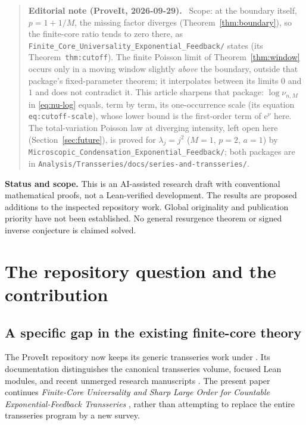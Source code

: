 \documentclass[11pt,a4paper]{article}
\numberwithin{equation}{section}
\theoremstyle{definition}
\theoremstyle{remark}
\newcommand{\ee}{\mathrm e}\newcommand{\dd}{\mathrm d}
\newenvironment{ednote}{\par\smallskip\begin{quote}\small\raggedright\textbf{Editorial note (ProveIt, 2026-09-29).}\ }{\end{quote}\smallskip}
\begin{document}
\begin{ednote}
Scope: at the boundary itself, $p=1+1/M$, the missing factor diverges
(Theorem~\ref{thm:boundary}), so the finite-core ratio tends to zero there,
as \nolinkurl{Finite_Core_Universality_Exponential_Feedback/} states (its
Theorem~\texttt{thm:cutoff}). The finite Poisson limit of
Theorem~\ref{thm:window} occurs only in a moving window slightly
\emph{above} the boundary, outside that package's fixed-parameter theorem;
it interpolates between its limits $0$ and $1$ and does not contradict it.
This article sharpens that package: $\log\nu_{n,M}$ in
\eqref{eq:nu-log} equals, term by term, its one-occurrence scale
(its equation \texttt{eq:cutoff-scale}), whose lower bound is the first-order term
of $\ee^{\nu}$ here. The total-variation Poisson law at diverging
intensity, left open here (Section~\ref{sec:future}), is proved for
$\lambda_j=j^2$ ($M=1$, $p=2$, $a=1$) by
\nolinkurl{Microscopic_Condensation_Exponential_Feedback/}; both packages
are in \nolinkurl{Analysis/Transseries/docs/series-and-transseries/}.
\end{ednote}
\noindent\textbf{Status and scope.}
This is an AI-assisted research draft with conventional mathematical proofs,
not a Lean-verified development. The results are proposed additions to the
inspected repository work. Global originality and publication priority have
not been established. No general resurgence theorem or signed inverse
conjecture is claimed solved.
\clearpage
\setcounter{tocdepth}{1}\hypersetup{bookmarksdepth=2}
\tableofcontents
\clearpage

\section{The repository question and the contribution}
\label{sec:context}
\subsection{A specific gap in the existing finite-core theory}
The ProveIt repository now keeps its generic transseries work under
. Its documentation distinguishes the canonical
transseries volume, focused Lean modules, and recent unmerged research
manuscripts \cite{repo-readme}. The present paper continues
\emph{Finite-Core Universality and Sharp Large Order for Countable
Exponential-Feedback Transseries} \cite{finite-core}, rather than attempting
to replace the entire transseries program by a new survey.
\end{document}
